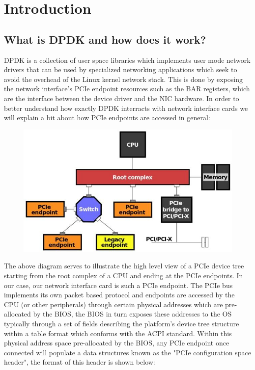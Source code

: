 \documentclass[a4paper,12p,titlepage]{article}
\begin{document}
\section{Introduction}
\subsection{What is DPDK and how does it work?}
DPDK is a collection of user space libraries which implements user mode network drivers that can be used by specialized networking applications which seek to avoid the overhead of the Linux kernel network stack. This is done by exposing the network interface’s PCIe endpoint resources such as the BAR registers, which are the interface between the device driver and the NIC hardware. In order to better understand how exactly DPDK interracts with network interface cards we will explain a bit about how PCIe endpoints are accessed in general:

\begin{figure}[h]
\centering
\includegraphics[width=\textwidth]{pcie}
\end{figure}

The above diagram serves to illustrate the high level view of a PCIe device tree starting from the root complex of a CPU and ending at the PCIe endpoints. In our case, our network interface card is such a PCIe endpoint. The PCIe bus implements its own packet based protocol and endpoints are accessed by the CPU (or other peripherals) through certain physical addresses which are pre-allocated by the BIOS, the BIOS in turn exposes these addresses to the OS typically through a set of fields describing the platform’s device tree structure within a table format which conforms with the ACPI standard.
Within this physical address space pre-allocated by the BIOS, any PCIe endpoint once connected will populate a data structures known as the "PCIe configuration space header", the format of this header is shown below:
\end{document}
